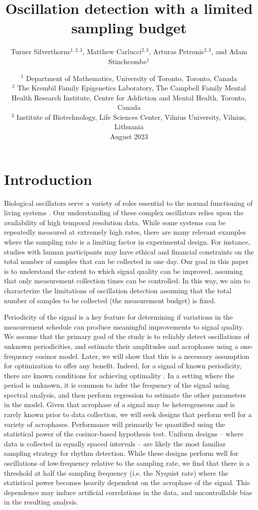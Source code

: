 \documentclass{article}
\title{Oscillation detection with a limited sampling budget}
\author{Turner Silverthorne$^{1,2,3}$, Matthew Carlucci$^{2,3}$, Arturas Petronis$^{2,3}$, and Adam Stinchcombe$^{1}$}
\date{
{\small $^1$ Department of Mathematics, University of Toronto, Toronto, Canada\\
$^2$ The Krembil Family Epigenetics Laboratory, The Campbell Family Mental Health Research Institute, Centre for Addiction and Mental Health, Toronto, Canada\\
$^3$ Institute of Biotechnology, Life Sciences Center, Vilnius University, Vilnius, Lithuania\\}
\vspace{1em}
August 2023}
\begin{document}
\maketitle
\listoftodos
\section{Introduction}
Biological oscillators serve a variety of roles essential to the normal functioning of living systems \cite{goldbeter1997biochemical}.  Our understanding of these complex oscillators relies upon the availability of high temporal resolution data. While some systems can be repeatedly measured at extremely high rates, there are many relevant examples where the sampling rate is a limiting factor in experimental design. For instance, studies with human participants may have ethical and financial constraints on the total number of samples that can be collected in one day.  Our goal in this paper is to understand the extent to which signal quality can be improved, assuming that only measurement collection times can be controlled. In this way, we aim to characterize the limitations of oscillation detection assuming that the total number of samples to be collected (the measurement budget) is fixed.


Periodicity of the signal is a key feature for determining if variations in the measurement schedule can produce meaningful improvements to signal quality. We assume that the primary goal of the study is to reliably detect oscillations of unknown periodicities, and estimate their amplitudes and acrophases using a one-frequency cosinor model. Later, we will show that this is a necessary assumption for optimization to offer any benefit. Indeed, for a signal of known periodicity, there are known conditions for achieving optimality \cite{}.  In a setting where the period is unknown, it is common to infer the frequency of the signal using spectral analysis, and then perform regression to estimate the other parameters in the model. Given that acrophase of a signal may be heterogeneous and is rarely known prior to data collection, we will seek designs that perform well for a variety of acrophases. Performance will primarily be quantified using the statistical power of the cosinor-based hypothesis test. Uniform designs -- where data is collected in equally spaced intervals -- are likely the most familiar sampling strategy for rhythm detection. While these designs perform well for  oscillations of low-frequency relative to the sampling rate, we find that there is a threshold at half the sampling frequency (i.e. the Nyquist rate) where the statistical power becomes heavily dependent on the acrophase of the signal. This dependence may induce artificial correlations in the data, and uncontrollable bias in the resulting analysis. 
\end{document}
